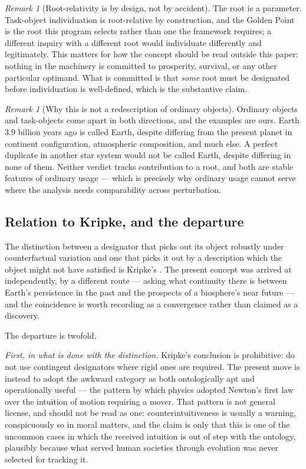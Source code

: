 \documentclass[11pt]{article}
\numberwithin{equation}{section}
\theoremstyle{plain}
\theoremstyle{definition}
\theoremstyle{remark}
\newtheorem{remark}[theorem]{Remark}
\begin{document}
\begin{remark}[Root-relativity is by design, not by accident]
\label{to:rem:rootrelative}
The root is a parameter. Task-object individuation is root-relative by
construction, and the Golden Point is the root this program selects
rather than one the framework requires; a different inquiry with a
different root would individuate differently and legitimately. This
matters for how the concept should be read outside this paper: nothing
in the machinery is committed to prosperity, survival, or any other
particular optimand. What is committed is that \emph{some} root must be
designated before individuation is well-defined, which is the
substantive claim.
\end{remark}

\begin{remark}[Why this is not a redescription of ordinary objects]
\label{to:rem:notredescription}
Ordinary objects and task-objects come apart in both directions, and the
examples are ours. Earth $3.9$ billion years ago is called
Earth, despite differing from the present planet in continent
configuration, atmospheric composition, and much else. A perfect
duplicate in another star system would not be called Earth, despite
differing in none of them. Neither verdict tracks contribution to a
root, and both are stable features of ordinary usage --- which is
precisely why ordinary usage cannot serve where the analysis needs
comparability across perturbation.
\end{remark}

\subsection{Relation to Kripke, and the departure}\label{to:sub:kripke}

The distinction between a designator that picks out its object robustly
under counterfactual variation and one that picks it out by a
description which the object might not have satisfied is Kripke's
\cite{kripke1980naming}. The present concept was arrived at independently, by a
different route --- asking what continuity there is between Earth's
persistence in the past and the prospects of a biosphere's near future
--- and the coincidence is worth recording as a convergence rather than
claimed as a discovery.

The departure is twofold.

\emph{First, in what is done with the distinction.} Kripke's conclusion
is prohibitive: do not use contingent designators where rigid ones are
required. The present move is instead to adopt the awkward category as
both ontologically apt and operationally useful --- the pattern by which
physics adopted Newton's first law over the intuition of motion
requiring a mover. That pattern is not general license, and should not
be read as one: counterintuitiveness is usually a warning, conspicuously
so in moral matters, and the claim is only that this is one of the
uncommon cases in which the received intuition is out of step with the
ontology, plausibly because what served human societies through
evolution was never selected for tracking it.
\end{document}
